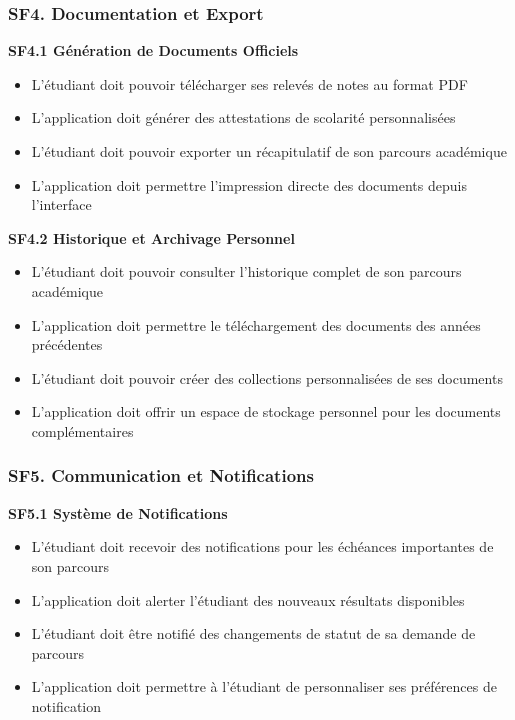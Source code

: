 \documentclass[12pt,a4paper]{report}
\begin{document}
\subsubsection{SF4. Documentation et Export}

\textbf{SF4.1 Génération de Documents Officiels}
\begin{itemize}
\item L'étudiant doit pouvoir télécharger ses relevés de notes au format PDF
\item L'application doit générer des attestations de scolarité personnalisées
\item L'étudiant doit pouvoir exporter un récapitulatif de son parcours académique
\item L'application doit permettre l'impression directe des documents depuis l'interface
\end{itemize}

\textbf{SF4.2 Historique et Archivage Personnel}
\begin{itemize}
\item L'étudiant doit pouvoir consulter l'historique complet de son parcours académique
\item L'application doit permettre le téléchargement des documents des années précédentes
\item L'étudiant doit pouvoir créer des collections personnalisées de ses documents
\item L'application doit offrir un espace de stockage personnel pour les documents complémentaires
\end{itemize}

\subsubsection{SF5. Communication et Notifications}

\textbf{SF5.1 Système de Notifications}
\begin{itemize}
\item L'étudiant doit recevoir des notifications pour les échéances importantes de son parcours
\item L'application doit alerter l'étudiant des nouveaux résultats disponibles
\item L'étudiant doit être notifié des changements de statut de sa demande de parcours
\item L'application doit permettre à l'étudiant de personnaliser ses préférences de notification
\end{itemize}
\end{document}
